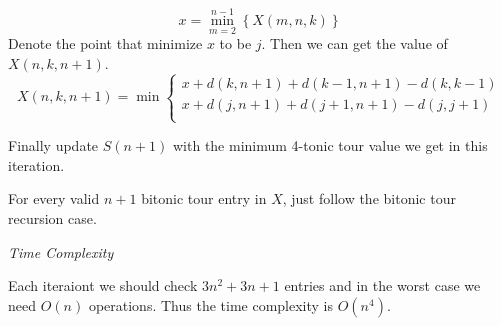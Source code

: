 \documentclass[12pt,letterpaper]{article}
\begin{document}
\[
	x=\min_{m=2}^{n-1}\left\{X(m,n,k)\right\}
\]
Denote the point that minimize $x$ to be $j$. Then we can get the value of $X(n,k,n+1)$.
\[
	X(n,k,n+1)=\min
	\begin{cases}
		x+d(k,n+1)+d(k-1, n+1)-d(k,k-1)\\
		x+d(j,n+1)+d(j+1, n+1)-d(j,j+1)\\
	\end{cases}
\]\par
Finally update $S(n+1)$ with the minimum 4-tonic tour value we get in this iteration.\par
For every valid $n+1$ bitonic tour entry in $X$, just follow the bitonic tour recursion case.\par
\medskip\noindent\textit{Time Complexity}\par
Each iteraiont we should check $3n^2+3n+1$ entries and in the worst case we need $O(n)$ operations. Thus the time complexity is $O(n^4)$.\par
\end{document}
